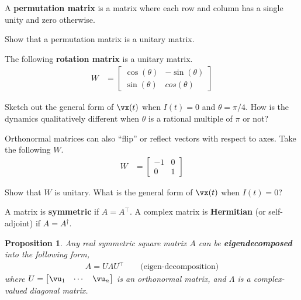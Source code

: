 \documentclass[a4paper,11pt]{exam}
\newtheorem{proposition}[theorem]{Proposition}
\newcounter{ct}
\newcommand{\trp}{{^\top}} %
\newcommand{\ctrp}{{^\dagger}} %
\begin{document}
\begin{questions}
A \textbf{permutation matrix} is a matrix where each row and column has a single unity and zero otherwise.

\question Show that a permutation matrix is a unitary matrix.

\clearpage
\question The following \textbf{rotation matrix} is a unitary matrix.
\begin{align}\label{eq:LA:rotation}
    W &=
    \begin{bmatrix}
	\cos(\theta) & -\sin(\theta)\\
	\sin(\theta) & cos(\theta)
    \end{bmatrix}
\end{align}
\begin{parts}
\subpart Sketch out the general form of $\vx(t)$ when $I(t) = 0$ and $\theta = \pi/4$.
\subpart How is the dynamics qualitatively different when $\theta$ is a rational multiple of $\pi$ or not?
\end{parts}

\question Orthonormal matrices can also ``flip'' or reflect vectors with respect to axes. Take the following $W$.
\begin{align}\label{eq:LA:flip}
    W &=
    \begin{bmatrix}
	-1 & 0\\
	 0 & 1
    \end{bmatrix}
\end{align}
\begin{parts}
\subpart Show that $W$ is unitary.
\subpart What is the general form of $\vx(t)$ when $I(t) = 0$?
\end{parts}

A matrix is \textbf{symmetric} if $A = A\trp$. A complex matrix is \textbf{Hermitian} (or self-adjoint) if $A = A\ctrp$.

\begin{proposition}
Any \textit{real symmetric square matrix} $A$ can be \textbf{eigendecomposed} into the following form,
\begin{align}\label{eq:eig}
    A = U \Lambda U\trp \qquad \text{(eigen-decomposition)}
\end{align}
where $U = \begin{bmatrix}\vu_1 & \cdots & \vu_n \end{bmatrix}$
is an orthonormal matrix, and $\Lambda$ is a complex-valued diagonal matrix.
\end{proposition}


\end{questions}
\end{document}
